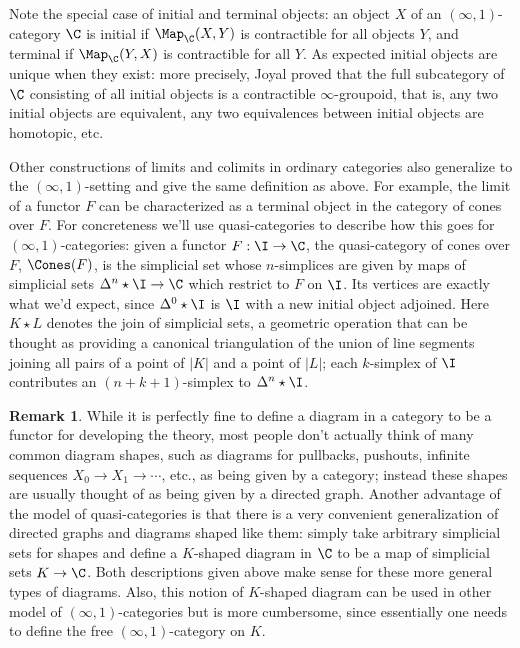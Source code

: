 \documentclass[12pt]{amsart}
\theoremstyle{definition} \newtheorem{definition}[theorem]{Definition}
\newtheorem{remark}[theorem]{Remark}
\numberwithin{equation}{section}
\newcommand{\oo}{\infty}
\newcommand{\io}{$(\oo,1)$}
\newcommand{\abs}[1]{\left|#1\right|}
\begin{document}
Note the special case of initial and terminal objects: an object $X$ of
an \io-category $\C$ is initial if $\Map_\C(X,Y)$ is contractible for all
objects $Y$, and terminal if $\Map_\C(Y,X)$ is contractible for all
$Y$. As expected initial objects are unique when they exist: more
precisely, Joyal proved that the full subcategory of $\C$ consisting
of all initial objects is a contractible $\oo$-groupoid, that is, any
two initial objects are equivalent, any two equivalences between
initial objects are homotopic, etc.

Other constructions of limits and colimits in ordinary categories also
generalize to the \io-setting and give the same definition as above.
For example, the limit of a functor $F$ can be characterized as a
terminal object in the category of cones over $F$. For concreteness
we'll use quasi-categories to describe how this goes for
\io-categories: given a functor $F : \I \to \C$, the quasi-category of
cones over $F$, $\Cones(F)$, is the simplicial set whose $n$-simplices
are given by maps of simplicial sets $\Delta^n \star \I \to \C$ which
restrict to $F$ on $\I$. Its vertices are exactly what we'd expect,
since $\Delta^0 \star \I$ is $\I$ with a new initial object adjoined.
Here $K \star L$ denotes the join of simplicial sets, a geometric
operation that can be thought as providing a canonical triangulation
of the union of line segments joining all pairs of a point of $\abs{K}$
and a point of $\abs{L}$; each $k$-simplex of $\I$ contributes an
$(n+k+1)$-simplex to $\Delta^n \star \I$.

\begin{remark}
  While it is perfectly fine to define a diagram in a category to be a
  functor for developing the theory, most people don't actually think
  of many common diagram shapes, such as diagrams for pullbacks,
  pushouts, infinite sequences $X_0 \to X_1 \to \cdots$, etc., as
  being given by a category; instead these shapes are usually thought
  of as being given by a directed graph. Another advantage of the
  model of quasi-categories is that there is a very convenient
  generalization of directed graphs and diagrams shaped like them:
  simply take arbitrary simplicial sets for shapes and define a
  $K$-shaped diagram in $\C$ to be a map of simplicial sets $K \to
  \C$. Both descriptions given above make sense for these more general
  types of diagrams. Also, this notion of $K$-shaped diagram can be
  used in other model of \io-categories but is more cumbersome, since
  essentially one needs to define the free \io-category on $K$.
\end{remark}
\end{document}
